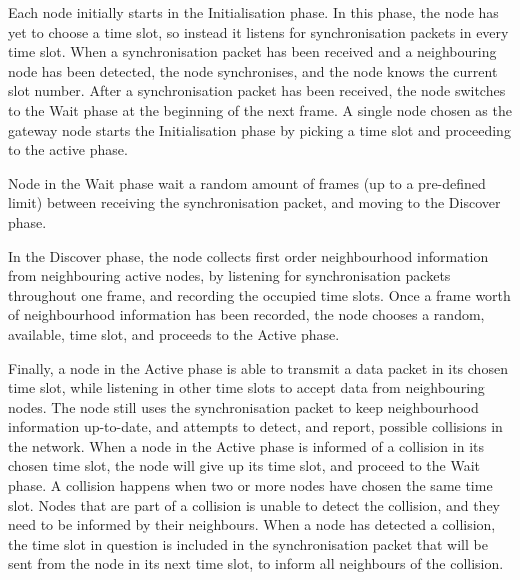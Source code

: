\begin{description}[style=nextline]
    \item[Initialisation] Each node initially starts in the Initialisation phase. In this phase, the node has
          yet to choose a time slot, so instead it listens for synchronisation packets in every time slot.
          When a synchronisation packet has been received and a neighbouring node has been detected, the node
          synchronises, and the node knows the current slot number. After a synchronisation packet has been
          received, the node switches to the Wait phase at the beginning of the next frame. A single node
          chosen as the gateway node starts the Initialisation phase by picking a time slot and proceeding to
          the active phase.
    \item[Wait] Node in the Wait phase wait a random amount of frames (up to a pre-defined limit) between
          receiving the synchronisation packet, and moving to the Discover phase.
    \item[Discover] In the Discover phase, the node collects first order neighbourhood information from
          neighbouring active nodes, by listening for synchronisation packets throughout one frame, and
          recording the occupied time slots. Once a frame worth of neighbourhood information has been
          recorded, the node chooses a random, available, time slot, and proceeds to the Active phase.
    \item[Active] Finally, a node in the Active phase is able to transmit a data packet in its chosen time
          slot, while listening in other time slots to accept data from neighbouring nodes. The node still
          uses the synchronisation packet to keep neighbourhood information up-to-date, and attempts to
          detect, and report, possible collisions in the network. When a node in the Active phase is informed
          of a collision in its chosen time slot, the node will give up its time slot, and proceed to the Wait
          phase. A collision happens when two or more nodes have chosen the same time slot. Nodes that are
          part of a collision is unable to detect the collision, and they need to be informed by their
          neighbours. When a node has detected a collision, the time slot in question is included in the
          synchronisation packet that will be sent from the node in its next time slot, to inform all
          neighbours of the collision.
\end{description}

